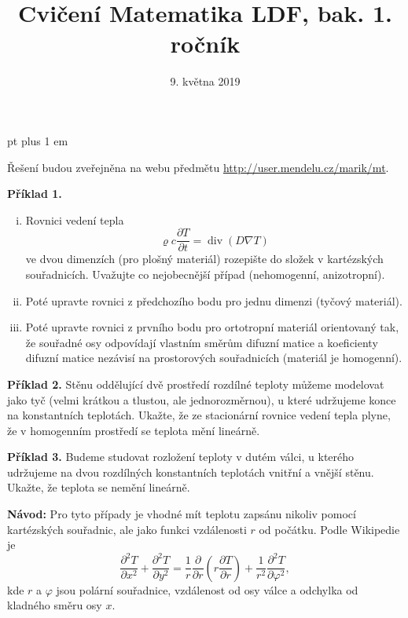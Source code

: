 \documentclass{article}
\let\rho\varrho
\let\oldtextbf\textbf
\def\textbf#1{%
  \oldtextbf{\color{red} #1}}
\begin{document}
 pt plus 1 em
\title{Cvičení Matematika LDF, bak. 1. ročník}
\date{9. května 2019}

\maketitle

Řešení budou zveřejněna na webu předmětu
\url{http://user.mendelu.cz/marik/mt}.  

\def\div{\mathop{\mathrm{div}}}

\newpage

\textbf{Příklad 1.}
\begin{enumerate}[(i)]
\item Rovnici vedení tepla
\begin{equation*}
  \rho c \frac{\partial T}{\partial t}=\div (D\nabla T)
\end{equation*}
ve dvou dimenzích (pro plošný materiál) rozepište do složek v
kartézských souřadnicích. Uvažujte co nejobecnější případ
(nehomogenní, anizotropní).
\item 
Poté upravte rovnici z předchozího bodu pro jednu dimenzi (tyčový materiál).
\item 
Poté upravte rovnici z prvního bodu pro ortotropní materiál orientovaný tak, že
souřadné osy odpovídají vlastním směrům difuzní matice a koeficienty
difuzní matice nezávisí na prostorových souřadnicích (materiál je
homogenní).
\end{enumerate}
\newpage

\textbf{Příklad 2.} Stěnu oddělující dvě prostředí rozdílné teploty
můžeme modelovat jako tyč (velmi krátkou a tlustou, ale
jednorozměrnou), u které udržujeme konce na konstantních
teplotách. Ukažte, že ze stacionární rovnice vedení tepla plyne, že v
homogenním prostředí se teplota mění lineárně.

\newpage
\textbf{Příklad 3.} Budeme studovat rozložení teploty v dutém válci, u
kterého udržujeme na dvou rozdílných konstantních teplotách vnitřní a
vnější stěnu. Ukažte, že teplota se nemění lineárně.

\textbf{Návod:} Pro tyto případy je vhodné mít teplotu zapsánu nikoliv pomocí kartézských souřadnic, ale jako funkci vzdálenosti $r$ od počátku. 
Podle Wikipedie je
\begin{equation*}
  \frac{\partial^2 T}{\partial x^2}+  \frac{\partial^2 T}{\partial y^2}
    =
    \frac 1r \frac{\partial}{\partial r}\left(r\frac{\partial T}{\partial r}\right)+\frac 1{r^2}\frac{\partial ^2 T}{\partial \varphi^2},   
  \end{equation*}
  kde $r$ a $\varphi$ jsou polární souřadnice, vzdálenost od osy válce a odchylka od kladného směru osy $x$.
\end{document}
